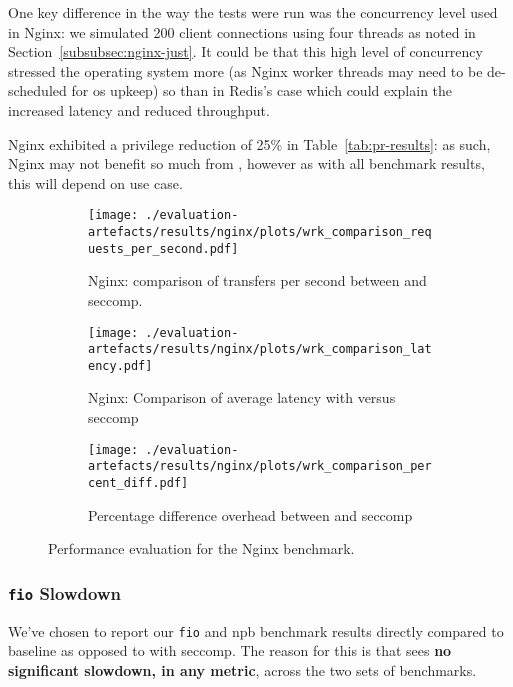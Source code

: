 One key difference in the way the tests were run was the concurrency level used
in Nginx: we simulated 200 client connections using four threads as noted in
Section~\ref{subsubsec:nginx-just}. It could be that this high level of
concurrency stressed the operating system more (as Nginx worker threads may need
to be de-scheduled for \ac{os} upkeep) so than in Redis's case which could
explain the increased latency and reduced throughput.

Nginx exhibited a privilege reduction of 25\% in Table~\ref{tab:pr-results}: as
such, Nginx may not benefit so much from \af, however as with all benchmark
results, this will depend on use case.

\begin{figure}[htbp]
    \centering
    \begin{subfigure}[b]{0.75 \textwidth}
        \centering
        \texttt{[image: ./evaluation-artefacts/results/nginx/plots/wrk\_comparison\_requests\_per\_second.pdf]} 
        \caption{Nginx: comparison of transfers per second between \af and
        seccomp.}
        \label{fig:nginx-rps}
    \end{subfigure}
    \hfill
     \begin{subfigure}[b]{0.45 \textwidth}
        \centering
        \texttt{[image: ./evaluation-artefacts/results/nginx/plots/wrk\_comparison\_latency.pdf]} 
        \caption{Nginx: Comparison of average latency with \af versus
        seccomp}
        \label{fig:nginx-time}
    \end{subfigure}
     \medskip 
     \begin{subfigure}[b]{0.45 \textwidth}
        \centering
        \texttt{[image: ./evaluation-artefacts/results/nginx/plots/wrk\_comparison\_percent\_diff.pdf]} %
        \caption{Percentage difference overhead between \af and seccomp}
        \label{fig:nginx-percdiff}
    \end{subfigure}

    \caption{Performance evaluation for the Nginx benchmark.}
    \label{fig:nginx-perf}
\end{figure}

\subsubsection{\texttt{fio} Slowdown}\label{subsubsec:fio-slowdown}

We've chosen to report our \texttt{fio} and \ac{npb} benchmark results directly
compared to baseline as opposed to with seccomp. The reason for this is that \af
sees \textbf{no significant slowdown, in any metric}, across the two sets of
benchmarks. 

